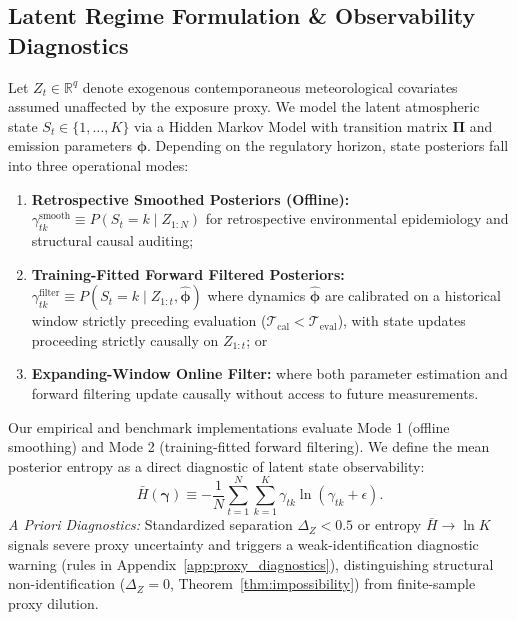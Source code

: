 \documentclass[twoside]{article}
\theoremstyle{definition}
\newcommand{\R}{\mathbb{R}}
\begin{document}
\subsection{Latent Regime Formulation \& Observability Diagnostics}
Let $Z_t \in \R^q$ denote exogenous contemporaneous meteorological covariates assumed unaffected by the exposure proxy. We model the latent atmospheric state $S_t \in \{1, \dots, K\}$ via a Hidden Markov Model with transition matrix $\boldsymbol{\Pi}$ and emission parameters $\boldsymbol{\phi}$.
Depending on the regulatory horizon, state posteriors fall into three operational modes:
\begin{enumerate}\setlength{\itemsep}{-2pt}\setlength{\parskip}{0pt}
    \item \textbf{Retrospective Smoothed Posteriors (Offline):} $\gamma_{tk}^{\mathrm{smooth}} \equiv P(S_t = k \mid Z_{1:N})$ for retrospective environmental epidemiology and structural causal auditing;
    \item \textbf{Training-Fitted Forward Filtered Posteriors:} $\gamma_{tk}^{\mathrm{filter}} \equiv P(S_t = k \mid Z_{1:t}, \hat{\boldsymbol{\phi}})$ where dynamics $\hat{\boldsymbol{\phi}}$ are calibrated on a historical window strictly preceding evaluation ($\mathcal{T}_{\mathrm{cal}} < \mathcal{T}_{\mathrm{eval}}$), with state updates proceeding strictly causally on $Z_{1:t}$; or
    \item \textbf{Expanding-Window Online Filter:} where both parameter estimation and forward filtering update causally without access to future measurements.
\end{enumerate}
Our empirical and benchmark implementations evaluate Mode 1 (offline smoothing) and Mode 2 (training-fitted forward filtering). We define the mean posterior entropy as a direct diagnostic of latent state observability:
\begin{equation}
    \bar{H}(\boldsymbol{\gamma}) \equiv -\frac{1}{N}\sum_{t=1}^N \sum_{k=1}^K \gamma_{tk} \ln(\gamma_{tk} + \epsilon).
\end{equation}
\emph{A Priori Diagnostics:} Standardized separation $\Delta_Z < 0.5$ or entropy $\bar{H} \to \ln K$ signals severe proxy uncertainty and triggers a weak-identification diagnostic warning (rules in Appendix~\ref{app:proxy_diagnostics}), distinguishing structural non-identification ($\Delta_Z = 0$, Theorem~\ref{thm:impossibility}) from finite-sample proxy dilution.
\end{document}
